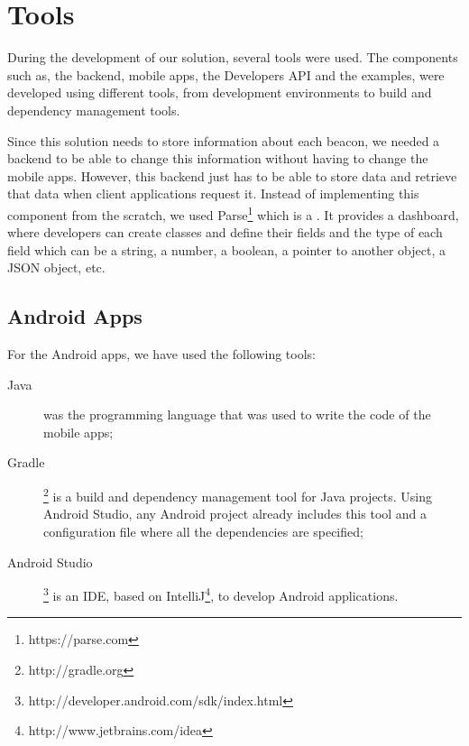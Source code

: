 \section{Tools}
\label{sec:implementation_tools}
During the development of our solution, several tools were used.
The components such as, the backend, mobile apps, the Developers \gls{API} and the examples, were developed using different tools, from development environments to build and dependency management tools.

Since this solution needs to store information about each beacon, we
needed a backend to be able to change this information without having
to change the mobile apps.
However, this backend just has to be able to store data and retrieve that
data when client applications request it.
Instead of implementing this component from the scratch, we used
Parse\footnote{https://parse.com} which is a .
It provides a dashboard, where developers can create classes
and define their fields and the type of each field which can be a string,
a number, a boolean, a pointer to another object, a \gls{JSON} object, etc.

\subsection{Android Apps}
\label{sub:implementation_tools_android_apps}
For the Android apps, we have used the following tools:
\begin{description}
  \item[Java] was the programming language that was used to write the code of the mobile apps;
  \item[Gradle] \footnote{http://gradle.org} is a build and dependency management tool for Java projects. Using Android Studio, any Android project already includes this tool and a configuration file where all the dependencies are specified;
  \item[Android Studio] \footnote{http://developer.android.com/sdk/index.html} is an \gls{IDE}, based on IntelliJ\footnote{http://www.jetbrains.com/idea},
  to develop Android
  applications.
\end{description}


